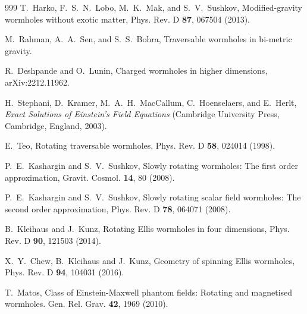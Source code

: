 \documentclass[aps,preprint,groupedaddress,nofootinbib,superscriptaddress,showkeys,showpacs,eqsecnum,amsmath,amssymb]{revtex4-1}
\begin{document}
\begin{thebibliography}{999}
T.~Harko, F.~S.~N.~Lobo, M.~K.~Mak, and S.~V.~Sushkov,
Modified-gravity wormholes without exotic matter,
Phys. Rev. D \textbf{87}, 067504 (2013).

M.~Rahman, A.~A.~Sen, and S.~S.~Bohra,
Traversable wormholes in bi-metric gravity.

R.~Deshpande and O.~Lunin,
Charged wormholes in higher dimensions, arXiv:2212.11962.


H.~Stephani, D.~Kramer, M.~A.~H.~MacCallum, C.~Hoenselaers, and E.~Herlt,
\emph{Exact Solutions of Einstein's Field Equations} (Cambridge University Press, Cambridge, England, 2003).

E.~Teo,
Rotating traversable wormholes,
Phys. Rev. D \textbf{58}, 024014 (1998).



P.~E.~Kashargin and S.~V.~Sushkov,
Slowly rotating wormholes: The first order approximation,
Gravit. Cosmol. \textbf{14}, 80 (2008).

P.~E.~Kashargin and S.~V.~Sushkov,
Slowly rotating scalar field wormholes: The second order approximation,
Phys. Rev. D \textbf{78}, 064071 (2008).


B.~Kleihaus and J.~Kunz,
Rotating Ellis wormholes in four dimensions,
Phys. Rev. D \textbf{90}, 121503 (2014).

X.~Y.~Chew, B.~Kleihaus and J.~Kunz,
Geometry of spinning Ellis wormholes,
Phys. Rev. D \textbf{94}, 104031 (2016).

T.~Matos,
Class of Einstein-Maxwell phantom fields: Rotating and magnetised wormholes. Gen. Rel. Grav. \textbf{42}, 1969 (2010).


\end{thebibliography}
\end{document}
